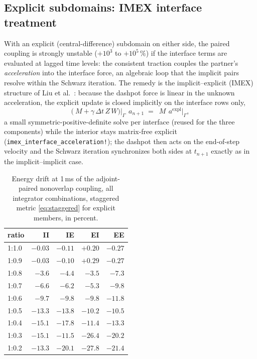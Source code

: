 \documentclass[11pt]{article}
\newcommand{\code}[1]{\texttt{#1}}
\begin{document}
\subsection{Explicit subdomains: IMEX interface treatment}
\label{sec:imex}

With an explicit (central-difference) subdomain on either side, the paired
coupling is strongly unstable ($+10^3$ to $+10^5\,\%$) if the interface
terms are evaluated at lagged time levels: the consistent traction couples
the partner's \emph{acceleration} into the interface force, an algebraic
loop that the implicit pairs resolve within the Schwarz iteration. The remedy
is the implicit--explicit (IMEX) structure of Liu et
al.~\cite{LiuEtAl2023}: because the dashpot force is linear in the unknown
acceleration, the explicit update is closed implicitly on the interface
rows only,
\begin{equation}
  \bigl(~M + \gamma\,\Delta t\,Z\,W\bigr)\big|_\Gamma\, ~a_{n+1}
  \;=\; ~M\,~a^{\mathrm{expl}}\big|_\Gamma,
  \label{eq:imex}
\end{equation}
a small symmetric-positive-definite solve per interface (reused for the
three components) while the interior stays matrix-free explicit
(\code{imex\_interface\_acceleration!}); the dashpot then acts on the
end-of-step velocity and the Schwarz iteration synchronizes both sides at
$t_{n+1}$ exactly as in the implicit--implicit case.

\begin{table}[htbp]
\centering
\caption{Energy drift at 1\,ms of the adjoint-paired nonoverlap coupling,
all integrator combinations, staggered metric \eqref{eq:staggered} for
explicit members, in percent.}
\label{tab:paired-all}
\begin{tabular}{lrrrr}
\toprule
ratio & II & IE & EI & EE \\
\midrule
1:1.0 & $-0.03$ & $-0.11$ & $+0.20$ & $-0.27$ \\
1:0.9 & $-0.03$ & $-0.10$ & $+0.29$ & $-0.27$ \\
1:0.8 & $-3.6$ & $-4.4$ & $-3.5$ & $-7.3$ \\
1:0.7 & $-6.6$ & $-6.2$ & $-5.3$ & $-9.8$ \\
1:0.6 & $-9.7$ & $-9.8$ & $-9.8$ & $-11.8$ \\
1:0.5 & $-13.3$ & $-13.8$ & $-10.2$ & $-10.5$ \\
1:0.4 & $-15.1$ & $-17.8$ & $-11.4$ & $-13.3$ \\
1:0.3 & $-15.1$ & $-11.5$ & $-26.4$ & $-20.2$ \\
1:0.2 & $-13.3$ & $-20.1$ & $-27.8$ & $-21.4$ \\
\bottomrule
\end{tabular}
\end{table}
\end{document}
